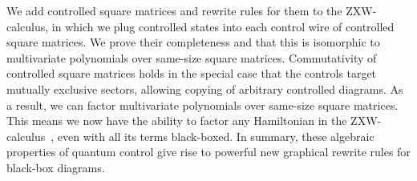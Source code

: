 We add controlled square matrices and rewrite rules for them to the ZXW-calculus, in which we plug controlled states into each control wire of controlled square matrices. We prove their completeness and that this is isomorphic to multivariate polynomials over same-size square matrices. Commutativity of controlled square matrices holds in the special case that the controls target mutually exclusive sectors, allowing copying of arbitrary controlled diagrams. As a result, we can factor multivariate polynomials over same-size square matrices. This means we now have the ability to factor any Hamiltonian in the ZXW-calculus~\cite{shaikh2022sum}, even with all its terms black-boxed. In summary, these algebraic properties of quantum control give rise to powerful new graphical rewrite rules for black-box diagrams.
